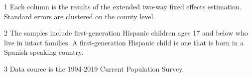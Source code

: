 \begin{table}[H]
{\begin{threeparttable}
\begin{tabular}[t]{lcccccccc}
\end{tabular}
\begin{tablenotes}
\small
\item[1] \footnotesize{Each column is the results of the extended two-way fixed effects estimation. 
                      Standard errors are clustered on the county level.}
\item[2] \footnotesize{The samples include first-generation Hispanic children ages 17 and below who live in intact families. 
                      A first-generation Hispanic child is one that is born in a Spanish-speaking country.}
\item[3] \footnotesize{Data source is the 1994-2019 Current Population Survey.}
\end{tablenotes}
\end{threeparttable}}
\end{table}
